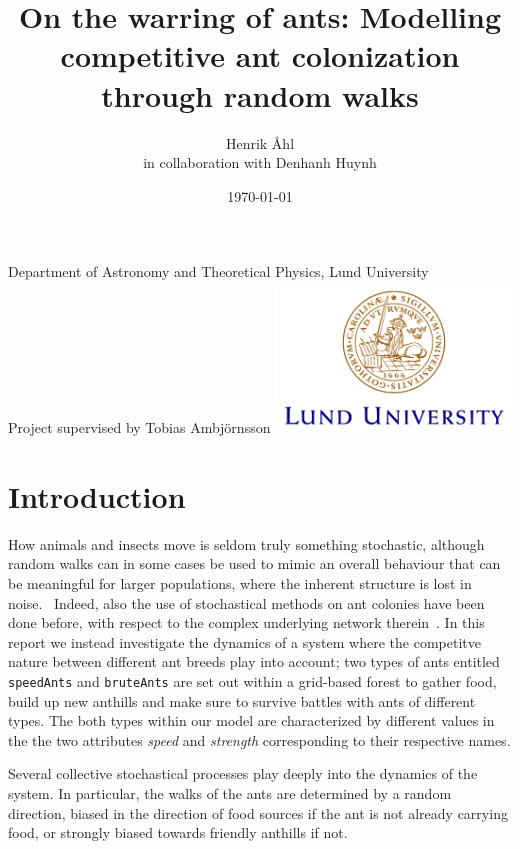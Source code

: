 \documentclass[a4paper,12pt]{article}
\title
{
	\textbf
	{
   On the warring of ants: Modelling competitive ant colonization through random walks
   }
}
\author{Henrik Åhl\\
\small{in collaboration with Denhanh Huynh}}
\date{\today}
\theoremstyle{plain}
\theoremstyle{definition}
\begin{document}
\begin{titlepage}
	
   \maketitle 
	\begin{center}
		\phantom{a}
		{Department of Astronomy and Theoretical Physics, Lund University}
		\\[2cm]
		{Project supervised by Tobias Ambjörnsson}
		\vfill
		\includegraphics[height=4cm]{logocLUeng.pdf}
	\end{center}
	\thispagestyle{empty} %
\end{titlepage}
\section{Introduction}
   How animals and insects move is seldom truly something stochastic, although
   random walks can in some cases be used to mimic an overall behaviour that can
   be meaningful for larger populations, where the inherent structure is lost
   in noise.~\cite{midges} Indeed, also the use of stochastical methods on ant
   colonies have been done before, with respect to the complex underlying
   network therein~\cite{ants}. In this report we instead investigate the dynamics of a
   system where the competitve nature between different ant breeds play into
   account; two types of ants entitled \texttt{speedAnts} and \texttt{bruteAnts}
   are set out within a grid-based forest to gather food, build up new anthills and 
   make sure to survive battles with ants of different types. The both types
   within our model are characterized by different values in the the two attributes 
   \emph{speed} and \emph{strength} corresponding to their respective names.  

   Several collective stochastical processes play deeply into the dynamics of the
   system. In particular, the walks of the ants are determined by a random direction,
   biased in the direction of food sources if the ant is not already carrying
   food, or strongly biased towards friendly anthills if not. 
\end{document}
